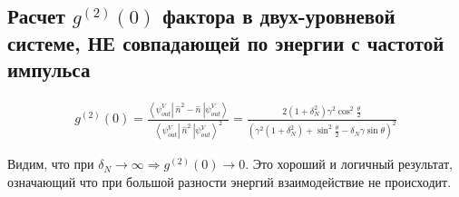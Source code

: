 \documentclass[11pt]{article}    %
\begin{document}
\subsection{Расчет $g^{(2)}(0)$ фактора в двух-уровневой системе, НЕ совпадающей по энергии с частотой импульса}

\begin{gather}
    g^{(2)}(0) = \frac{ \left< \psi_{out}^V \left| \ \hat{n}^2 - \hat{n} \ \right| \psi_{out}^V \right>}{\left< \psi_{out}^V \left| \ \hat{n}^2 \ \right| \psi_{out}^V \right> ^2 } = \frac{2 \left( 1+\delta_N^2 \right) \gamma^2 \cos^2 \frac{\theta}{2} }{\left( \gamma^2 \left( 1 + \delta_N^2 \right) + \sin^2 \frac{\theta}{2} - \delta_N \gamma \sin \theta \right)^2}
\end{gather}

Видим, что при $ \delta_N  \rightarrow \infty \Rightarrow g^{(2)}(0) \rightarrow 0 $. Это хороший и логичный результат, означающий что при большой разности энергий взаимодействие не происходит.
\end{document}
